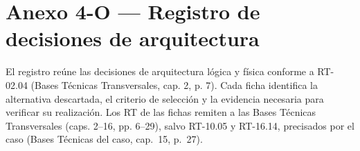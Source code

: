 \clearpage
\section*{Anexo 4-O — Registro de decisiones de arquitectura}
\label{fuente-18-anexo-4-1-o-decisiones-logicas}
\label{anx:O}

El registro reúne las decisiones de arquitectura lógica y física conforme a RT-02.04 (Bases Técnicas Transversales, cap. 2, p. 7). Cada ficha identifica la alternativa descartada, el criterio de selección y la evidencia necesaria para verificar su realización. Los RT de las fichas remiten a las Bases Técnicas Transversales (caps. 2--16, pp. 6--29), salvo RT-10.05 y RT-16.14, precisados por el caso (Bases Técnicas del caso, cap.~15, p.~27).

